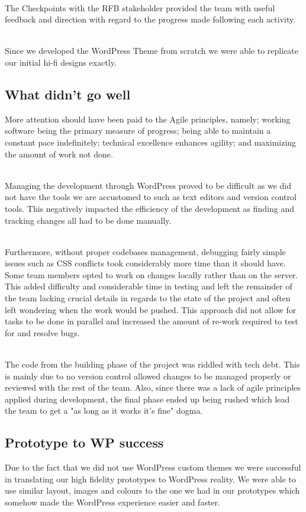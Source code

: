 \documentclass[english,course]{lecture}
\begin{document}
\\The Checkpoints with the RFB stakeholder provided the team with useful feedback and direction with regard to the progress made following each activity.

\\Since we developed the WordPress Theme from scratch we were able to replicate our initial hi-fi designs exactly.

\subsection{What didn't go well}
More attention should have been paid to the Agile principles, namely; working software being the primary measure of progress; being able to maintain a constant pace indefinitely; technical excellence enhances agility; and maximizing the amount of work not done.

\\Managing the development through WordPress proved to be difficult as we did not have the tools we are accustomed to such as text editors and version control tools. This negatively impacted the efficiency of the development as finding and tracking changes all had to be done manually.

\\Furthermore, without proper codebases management, debugging fairly simple issues such as CSS conflicts took considerably more time than it should have. Some team members opted to work on changes locally rather than on the server. This added difficulty and considerable time in testing and left the remainder of the team lacking crucial details in regards to the state of the project and often left wondering when the work would be pushed. This approach did not allow for tasks to be done in parallel and increased the amount of re-work required to test for and resolve bugs.

\\The code from the building phase of the project was riddled with tech debt. This is mainly due to no version control allowed changes to be managed properly or reviewed with the rest of the team. Also, since there was a lack of agile principles applied during development, the final phase ended up being rushed which lead the team to get a "as long as it works it's fine" dogma.

\subsection{Prototype to WP success}
Due to the fact that we did not use WordPress custom themes we were successful in translating our high fidelity prototypes to WordPress reality. We were able to use similar layout, images and colours to the one we had in our prototypes which somehow made the WordPress experience easier and faster.
\end{document}
